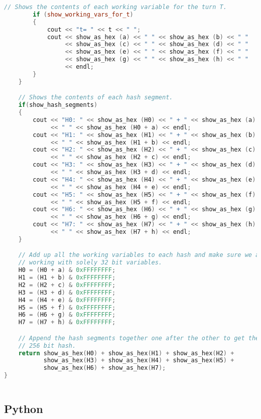 \begin{lstlisting}[language = C++]
		// Shows the contents of each working variable for the turn T.
		if (show_working_vars_for_t)
		{
			cout << "t= " << t << " ";
			cout << show_as_hex (a) << " " << show_as_hex (b) << " " 
			     << show_as_hex (c) << " " << show_as_hex (d) << " " 
			     << show_as_hex (e) << " " << show_as_hex (f) << " "
			     << show_as_hex (g) << " " << show_as_hex (h) << " " 
			     << endl;
		}
	}

	// Shows the contents of each hash segment.
	if(show_hash_segments)
	{
		cout << "H0: " << show_as_hex (H0) << " + " << show_as_hex (a)
			 << " " << show_as_hex (H0 + a) << endl;
		cout << "H1: " << show_as_hex (H1) << " + " << show_as_hex (b)
			 << " " << show_as_hex (H1 + b) << endl;
		cout << "H2: " << show_as_hex (H2) << " + " << show_as_hex (c)
			 << " " << show_as_hex (H2 + c) << endl;
		cout << "H3: " << show_as_hex (H3) << " + " << show_as_hex (d)
			 << " " << show_as_hex (H3 + d) << endl;
		cout << "H4: " << show_as_hex (H4) << " + " << show_as_hex (e)
			 << " " << show_as_hex (H4 + e) << endl;
		cout << "H5: " << show_as_hex (H5) << " + " << show_as_hex (f)
			 << " " << show_as_hex (H5 + f) << endl;
		cout << "H6: " << show_as_hex (H6) << " + " << show_as_hex (g)
			 << " " << show_as_hex (H6 + g) << endl;
		cout << "H7: " << show_as_hex (H7) << " + " << show_as_hex (h)
			 << " " << show_as_hex (H7 + h) << endl;
	}

	// Add up all the working variables to each hash and make sure we are still
	// working with solely 32 bit variables.
	H0 = (H0 + a) & 0xFFFFFFFF;
	H1 = (H1 + b) & 0xFFFFFFFF;
	H2 = (H2 + c) & 0xFFFFFFFF;
	H3 = (H3 + d) & 0xFFFFFFFF;
	H4 = (H4 + e) & 0xFFFFFFFF;
	H5 = (H5 + f) & 0xFFFFFFFF;
	H6 = (H6 + g) & 0xFFFFFFFF;
	H7 = (H7 + h) & 0xFFFFFFFF;

	// Append the hash segments together one after the other to get the full
	// 256 bit hash.
	return show_as_hex(H0) + show_as_hex(H1) + show_as_hex(H2) +
		   show_as_hex(H3) + show_as_hex(H4) + show_as_hex(H5) +
		   show_as_hex(H6) + show_as_hex(H7);
}
    
\end{lstlisting}

\subsection{Python}
